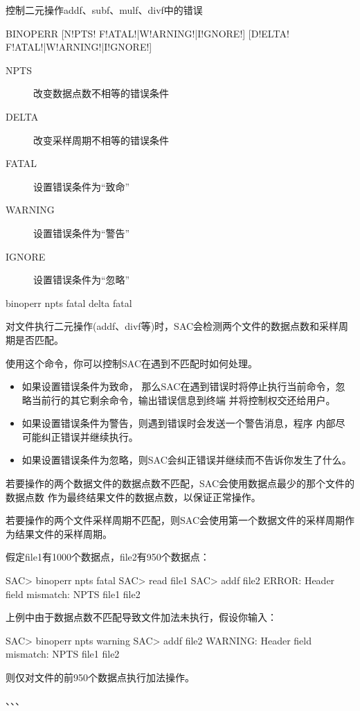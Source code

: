 \label{cmd:binoperr}

控制二元操作addf、subf、mulf、divf中的错误

\begin{SACSTX}
BINOPERR [N!PTS! F!ATAL!|W!ARNING!|I!GNORE!] [D!ELTA! F!ATAL!|W!ARNING!|I!GNORE!]
\end{SACSTX}

\begin{description}
\item [NPTS]  改变数据点数不相等的错误条件
\item [DELTA] 改变采样周期不相等的错误条件
\item [FATAL] 设置错误条件为``致命''
\item [WARNING] 设置错误条件为``警告''
\item [IGNORE]  设置错误条件为``忽略''
\end{description}

\begin{SACDFT}
binoperr npts fatal delta fatal
\end{SACDFT}

对文件执行二元操作(addf、divf等)时，SAC会检测两个文件的数据点数和采样周期是否匹配。

使用这个命令，你可以控制SAC在遇到不匹配时如何处理。
\begin{itemize}
\item 如果设置错误条件为致命，
那么SAC在遇到错误时将停止执行当前命令，忽略当前行的其它剩余命令，输出错误信息到终端
并将控制权交还给用户。
\item 如果设置错误条件为警告，则遇到错误时会发送一个警告消息，程序
内部尽可能纠正错误并继续执行。
\item 如果设置错误条件为忽略，则SAC会纠正错误并继续而不告诉你发生了什么。
\end{itemize}

若要操作的两个数据文件的数据点数不匹配，SAC会使用数据点最少的那个文件的数据点数
作为最终结果文件的数据点数，以保证正常操作。

若要操作的两个文件采样周期不匹配，则SAC会使用第一个数据文件的采样周期作为结果文件的采样周期。

假定file1有1000个数据点，file2有950个数据点：
\begin{SACCode}
SAC> binoperr npts fatal
SAC> read file1
SAC> addf file2
ERROR:  Header field mismatch: NPTS file1 file2
\end{SACCode}

上例中由于数据点数不匹配导致文件加法未执行，假设你输入：
\begin{SACCode}
SAC> binoperr npts warning
SAC> addf file2
WARNING:  Header field mismatch: NPTS file1 file2
\end{SACCode}
则仅对文件的前950个数据点执行加法操作。

、、、
